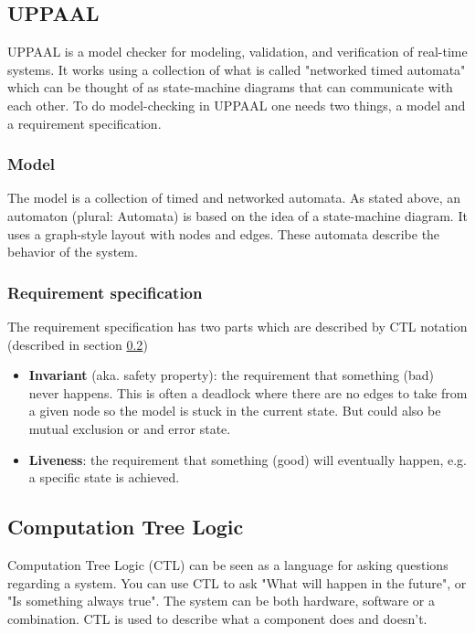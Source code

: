 \subsection{UPPAAL} 
UPPAAL is a model checker for modeling, validation, and verification of real-time systems. It works using a collection of what is called "networked timed automata" which can be thought of as state-machine diagrams that can communicate with each other. To do model-checking in UPPAAL one needs two things, a model and a requirement specification.
\subsubsection{Model}
The model is a collection of timed and networked automata. As stated above, an automaton (plural: Automata) is based on the idea of a state-machine diagram. It uses a graph-style layout with nodes and edges. These automata describe the behavior of the system.
\subsubsection{Requirement specification}
The requirement specification has two parts which are described by CTL notation (described in section \ref{subsec:CTL})
\begin{itemize}
    \item \textbf{Invariant} (aka. safety property): the requirement that something (bad) never happens. This is often a deadlock where there are no edges to take from a given node so the model is stuck in the current state. But could also be mutual exclusion or and error state.
    \item \textbf{Liveness}: the requirement that something (good) will eventually happen, e.g. a specific state is achieved.
\end{itemize}



\subsection{Computation Tree Logic}
\label{subsec:CTL}
Computation Tree Logic (CTL) can be seen as a language for asking questions regarding a system. You can use CTL to ask "What will happen in the future", or "Is something always true". The system can be both hardware, software or a combination. CTL is used to describe what a component does and doesn't.

